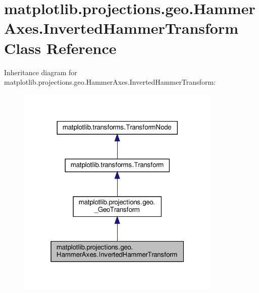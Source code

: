 \hypertarget{classmatplotlib_1_1projections_1_1geo_1_1HammerAxes_1_1InvertedHammerTransform}{}\section{matplotlib.\+projections.\+geo.\+Hammer\+Axes.\+Inverted\+Hammer\+Transform Class Reference}
\label{classmatplotlib_1_1projections_1_1geo_1_1HammerAxes_1_1InvertedHammerTransform}


Inheritance diagram for matplotlib.\+projections.\+geo.\+Hammer\+Axes.\+Inverted\+Hammer\+Transform\+:
\nopagebreak
\begin{figure}[H]
\begin{center}
\leavevmode
\includegraphics[width=277pt]{classmatplotlib_1_1projections_1_1geo_1_1HammerAxes_1_1InvertedHammerTransform__inherit__graph}
\end{center}
\end{figure}


